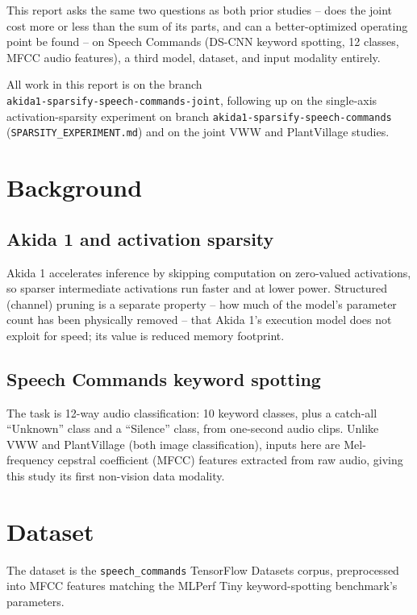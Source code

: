 \documentclass[11pt]{article}
\newcommand{\code}[1]{\texttt{#1}}
\begin{document}
This report asks the same two questions as both prior studies -- does the joint cost more or less than the sum of its parts, and can a better-optimized operating point be found -- on Speech Commands (DS-CNN keyword spotting, 12 classes, MFCC audio features), a third model, dataset, and input modality entirely.

All work in this report is on the branch\\
\code{akida1-\allowbreak sparsify-\allowbreak speech-\allowbreak commands-\allowbreak joint}, following up on the single-axis activation-sparsity experiment on branch \code{akida1-\allowbreak sparsify-\allowbreak speech-\allowbreak commands} (\code{SPARSITY\_EXPERIMENT.\allowbreak md}) and on the joint VWW and PlantVillage studies.

\section{Background}

\subsection{Akida 1 and activation sparsity}

Akida 1 accelerates inference by skipping computation on zero-valued activations, so sparser intermediate activations run faster and at lower power. Structured (channel) pruning is a separate property -- how much of the model's parameter count has been physically removed -- that Akida 1's execution model does not exploit for speed; its value is reduced memory footprint.

\subsection{Speech Commands keyword spotting}

The task is 12-way audio classification: 10 keyword classes, plus a catch-all ``Unknown'' class and a ``Silence'' class, from one-second audio clips. Unlike VWW and PlantVillage (both image classification), inputs here are Mel-frequency cepstral coefficient (MFCC) features extracted from raw audio, giving this study its first non-vision data modality.

\section{Dataset}

The dataset is the \code{speech\_commands} TensorFlow Datasets corpus, preprocessed into MFCC features matching the MLPerf Tiny keyword-spotting benchmark's parameters.
\end{document}
